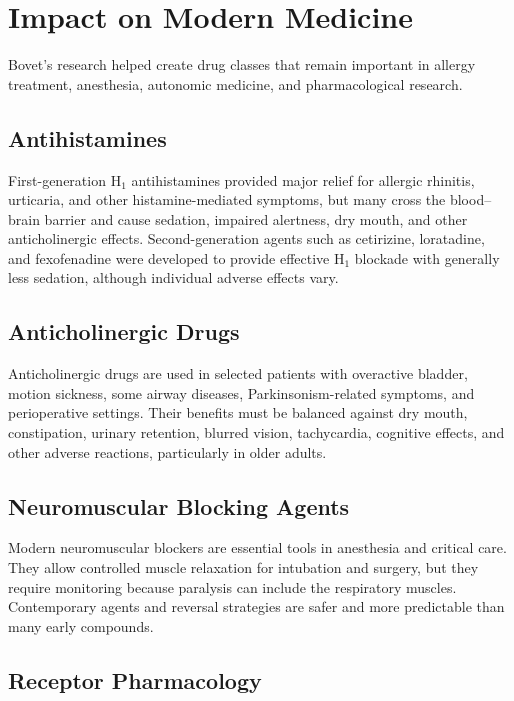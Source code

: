 \section{Impact on Modern Medicine}

Bovet's research helped create drug classes that remain important in allergy treatment, anesthesia, autonomic medicine, and pharmacological research.

\subsection{Antihistamines}

First-generation H$_1$ antihistamines provided major relief for allergic rhinitis, urticaria, and other histamine-mediated symptoms, but many cross the blood--brain barrier and cause sedation, impaired alertness, dry mouth, and other anticholinergic effects. Second-generation agents such as cetirizine, loratadine, and fexofenadine were developed to provide effective H$_1$ blockade with generally less sedation, although individual adverse effects vary.

\subsection{Anticholinergic Drugs}

Anticholinergic drugs are used in selected patients with overactive bladder, motion sickness, some airway diseases, Parkinsonism-related symptoms, and perioperative settings. Their benefits must be balanced against dry mouth, constipation, urinary retention, blurred vision, tachycardia, cognitive effects, and other adverse reactions, particularly in older adults.

\subsection{Neuromuscular Blocking Agents}

Modern neuromuscular blockers are essential tools in anesthesia and critical care. They allow controlled muscle relaxation for intubation and surgery, but they require monitoring because paralysis can include the respiratory muscles. Contemporary agents and reversal strategies are safer and more predictable than many early compounds.

\subsection{Receptor Pharmacology}

